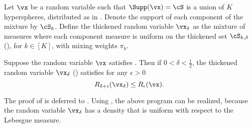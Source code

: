 \documentclass[../../book-main.tex]{subfiles}
\begin{document}
\begin{definition}\label{def:thickening-rv-uos}
    Let $\vx$ be a random variable such that $\Supp(\vx) = \cS$ is a union of
    $K$ hyperspheres, distributed as in .
    Denote the support of each component of the mixture by $\cS_k$.
    Define the thickened random variable $\vx_{\delta}$ as the mixture of
    measures where each component measure is uniform on the thickened set
    $\cS_{k, \delta}$ (), for $k \in [K]$, with mixing
    weights $\pi_k$.
\end{definition}


\begin{lemma}\label{lem:rate-distortion-lb-uos}
    Suppose the random variable $\vx$ satisfies
    . Then if $0 < \delta < \tfrac{1}{2}$, the
    thickened random variable $\vx_{\delta}$ ()
    satisfies for any $\epsilon > 0$
    \begin{equation}
        R_{\delta + \epsilon}(\vx_{\delta})
        \leq
        R_{\epsilon}(\vx).
    \end{equation}
\end{lemma}

The proof of  is deferred to
.
Using , the above program can be realized,
because the random variable $\vx_{\delta}$ has a density that is uniform with
respect to the Lebesgue measure.
\end{document}
